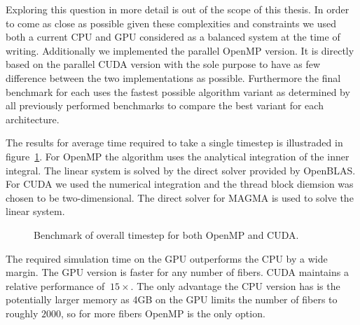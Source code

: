 \documentclass[a4paper,11pt]{kth-mag}
\begin{document}
Exploring this question in more detail is out of the scope of this thesis. In order to come as close as possible given these complexities and constraints we used both a current CPU and GPU considered as a balanced system at the time of writing. Additionally we implemented the parallel OpenMP version. It is directly based on the parallel CUDA version with the sole purpose to have as few difference between the two implementations as possible. Furthermore the final benchmark for each uses the fastest possible algorithm variant as determined by all previously performed benchmarks to compare the best variant for each architecture.

The results for average time required to take a single timestep is illustraded in figure~\ref{fig:overall}. For OpenMP the algorithm uses the analytical integration of the inner integral. The linear system is solved by the direct solver provided by OpenBLAS. For CUDA we used the numerical integration and the thread block diemsion was chosen to be two-dimensional. The direct solver for MAGMA is used to solve the linear system.

\begin{figure}
  \centering
  \caption{Benchmark of overall timestep for both OpenMP and CUDA.}
  \label{fig:overall}
\end{figure}

The required simulation time on the GPU outperforms the CPU by a wide margin. The GPU version is faster for any number of fibers. CUDA maintains a relative performance of $~15\times$. The only advantage the CPU version has is the potentially larger memory as 4GB on the GPU limits the number of fibers to roughly $2000$, so for more fibers OpenMP is the only option.
\end{document}
